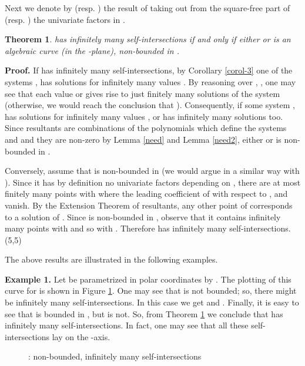 \documentclass{elsart}
\def\qed{\hfill  \framebox(5,5){}}
\newtheorem{theorem}{{\bf Theorem}}
\begin{document}
Next we denote by  (resp. ) the result of taking out
from the square-free part of  (resp. ) the univariate factors in
.


\begin{theorem} \label{th-4}
  has infinitely many self-intersections if and only if either  or 
is an algebraic curve (in the
-plane), non-bounded in .
\end{theorem}

{\bf Proof.}
If  has infinitely many self-intersections,  by Corollary \ref{corol-3} one of the systems ,  has solutions for infinitely many values . By reasoning over , , one may see that each value  or  gives rise to just finitely many solutions of the system (otherwise, we would reach the conclusion that ). Consequently, if some system ,  has solutions for infinitely many values ,  or  has infinitely many solutions too. Since resultants are  combinations of the polynomials which define the systems  and  and they are non-zero by Lemma \ref{need} and Lemma \ref{need2}, either  or  is non-bounded in .

Conversely,  assume that  is
non-bounded in  (we would argue in a similar way with ). Since it has by definition no univariate factors depending on , there are at most finitely many points  with  where the leading coefficient of  with respect to ,  and  vanish. By the Extension Theorem of resultants, any
other point of  corresponds to a solution of . Since  is non-bounded in , observe that it contains infinitely many points with  and so with . Therefore   has infinitely many self-intersections. \qed


The above results are illustrated in the following examples.

{\bf Example 1.} Let  be parametrized in polar coordinates by . The plotting of this curve for  is shown in Figure \ref{ej1}. One may see that  is not bounded; so, there might be infinitely many self-intersections. In this case we get  and .
Finally, it is easy to see that  is bounded in , but  is not. So, from Theorem \ref{th-4} we conclude that
 has infinitely many self-intersections. In fact, one may see that all these self-intersections lay on the -axis.

\begin{figure}[ht]
\begin{center}
\centerline{  }
\end{center}
\caption{:  non-bounded, infinitely many self-intersections}\label{ej1}
\end{figure}
\end{document}
